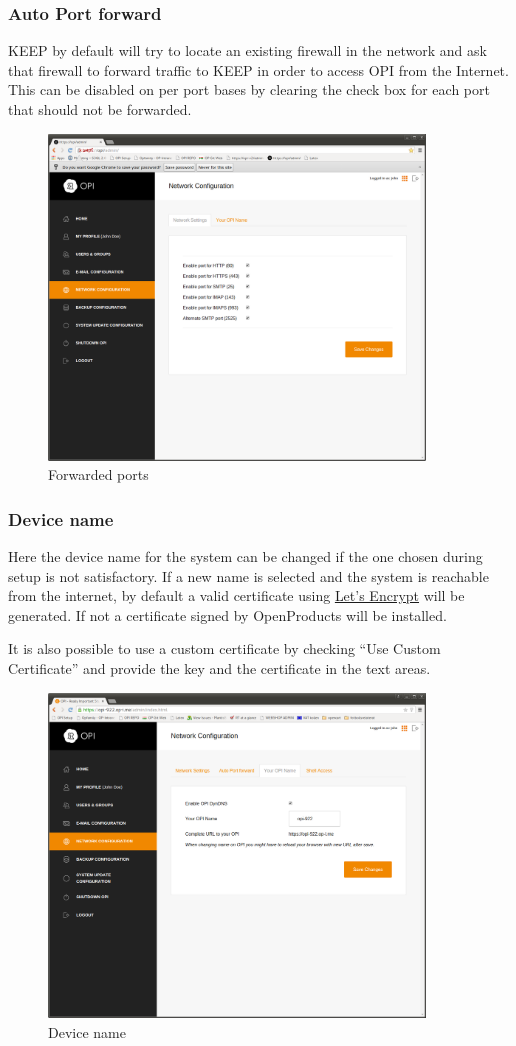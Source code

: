 \documentclass[12pt,a4paper,titlepage]{article}
\begin{document}
\subsubsection{Auto Port forward}
KEEP by default will try to locate an existing firewall in the network and ask that firewall to forward traffic to KEEP in order to access OPI from the Internet. This can be disabled on per port bases by clearing the check box for each port that should not be forwarded.
\begin{figure}[h!]
\centering
\includegraphics[width=10cm]{./img/network-config-1}
\caption{Forwarded ports}
\end{figure}
\FloatBarrier
\subsubsection{Device name}
Here the device name for the system can be changed if the one chosen during setup is not satisfactory.
If a new name is selected and the system is reachable from the internet, by default a valid certificate using \href{https://letsencrypt.org/}{Let's Encrypt} will be generated. If not a certificate signed by OpenProducts will be installed.

It is also possible to use a custom certificate by checking ``Use Custom Certificate'' and provide the key and the certificate in the text areas.
\begin{figure}[h!]
\centering
\includegraphics[width=10cm]{./img/network-opiname}
\caption{Device name}
\end{figure}
\FloatBarrier
\end{document}
